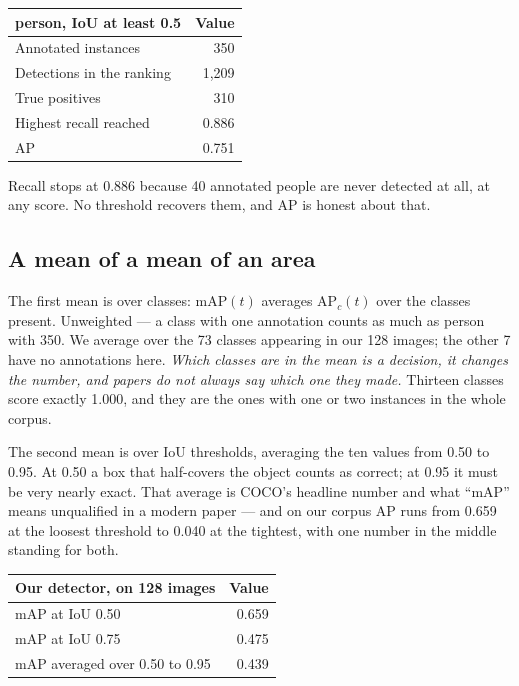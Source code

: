 \documentclass[11pt,a4paper]{article}
\begin{document}
\begin{center}
\small
\begin{tabular}{lr}
\toprule
\textbf{person, IoU at least 0.5} & \textbf{Value} \\
\midrule
Annotated instances & 350 \\
Detections in the ranking & 1{,}209 \\
True positives & 310 \\
Highest recall reached & 0.886 \\
AP & 0.751 \\
\bottomrule
\end{tabular}
\end{center}

Recall stops at 0.886 because 40 annotated people are never detected at all, at
any score. No threshold recovers them, and AP is honest about that.

\subsection{A mean of a mean of an area}

The first mean is over classes: $\mathrm{mAP}(t)$ averages $\mathrm{AP}_c(t)$
over the classes present. Unweighted --- a class with one annotation counts as
much as person with 350. We average over the 73 classes appearing in our 128
images; the other 7 have no annotations here. \emph{Which classes are in the
mean is a decision, it changes the number, and papers do not always say which
one they made.} Thirteen classes score exactly 1.000, and they are the ones
with one or two instances in the whole corpus.

The second mean is over IoU thresholds, averaging the ten values from 0.50 to
0.95. At 0.50 a box that half-covers the object counts as correct; at 0.95 it
must be very nearly exact. That average is COCO's headline number and what
``mAP'' means unqualified in a modern paper --- and on our corpus AP runs from
0.659 at the loosest threshold to 0.040 at the tightest, with one number in the
middle standing for both.

\begin{center}
\small
\begin{tabular}{lr}
\toprule
\textbf{Our detector, on 128 images} & \textbf{Value} \\
\midrule
mAP at IoU 0.50 & 0.659 \\
mAP at IoU 0.75 & 0.475 \\
mAP averaged over 0.50 to 0.95 & 0.439 \\
\bottomrule
\end{tabular}
\end{center}
\end{document}
